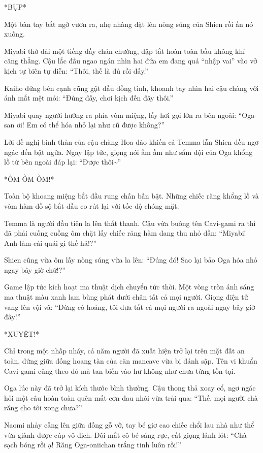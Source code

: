 \documentclass[../main.tex]{subfiles}
\begin{document}
*BỤP*

Một bàn tay bất ngờ vươn ra, nhẹ nhàng đặt lên nòng súng của Shien rồi ấn nó xuống.

Miyabi thở dài một tiếng đầy chán chường, dập tắt hoàn toàn bầu không khí căng thẳng. Cậu lắc đầu ngao ngán nhìn hai đứa em đang quá ``nhập vai'' vào vở kịch tự biên tự diễn: ``Thôi, thế là đủ rồi đấy.''

Kaiho đứng bên cạnh cũng gật đầu đồng tình, khoanh tay nhìn hai cậu chàng với ánh mắt mệt mỏi: ``Đúng đấy, chơi kịch đến đây thôi.''

Miyabi quay người hướng ra phía vòm miệng, lấy hơi gọi lớn ra bên ngoài: ``Oga-san ơi! Em có thể hóa nhỏ lại như cũ được không?''


Lời đề nghị bình thản của cậu chàng Hoa đào khiến cả Temma lẫn Shien đều ngơ ngác đến bật ngửa. Ngay lập tức, giọng nói ầm ầm như sấm dội của Oga khổng lồ từ bên ngoài đáp lại: ``Được thôi\~{}''

*ỒM ỒM ỒM!*

Toàn bộ khoang miệng bắt đầu rung chấn bần bật. Những chiếc răng khổng lồ và vòm hàm đồ sộ bắt đầu co rút lại với tốc độ chóng mặt.

Temma là người đầu tiên la lên thất thanh. Cậu vừa buông tên Cavi-gami ra thì đã phải cuống cuồng ôm chặt lấy chiếc răng hàm đang thu nhỏ dần: ``Miyabi! Anh làm cái quái gì thế hả!?''

Shien cũng vừa ôm lấy nòng súng vừa la lên: ``Đúng đó! Sao lại bảo Oga hóa nhỏ ngay bây giờ chứ!?''

Game lập tức kích hoạt ma thuật dịch chuyển tức thời. Một vòng tròn ánh sáng ma thuật màu xanh lam bùng phát dưới chân tất cả mọi người. Giọng điện tử vang lên vội vã: ``Đừng có hoảng, tôi đưa tất cả mọi người ra ngoài ngay bây giờ đây!''

*XUYỆT!*

Chỉ trong một nhấp nháy, cả năm người đã xuất hiện trở lại trên mặt đất an toàn, đứng giữa đống hoang tàn của căn mancave vừa bị đánh sập. Tên vi khuẩn Cavi-gami cũng theo đó mà tan biến vào hư không như chưa từng tồn tại.

\ct

Oga lúc này đã trở lại kích thước bình thường. Cậu thong thả xoay cổ, ngơ ngác hỏi một câu hoàn toàn quên mất cơn đau nhói vừa trải qua: ``Thế, mọi người chà răng cho tôi xong chưa?''

Naomi nhảy cẫng lên giữa đống gỗ vỡ, tay bé giơ cao chiếc chổi lau nhà như thể vừa giành được cúp vô địch. Đôi mắt cô bé sáng rực, cất giọng lảnh lót: ``Chà sạch bóng rồi ạ! Răng Oga-oniichan trắng tinh luôn rồi!''
\end{document}
